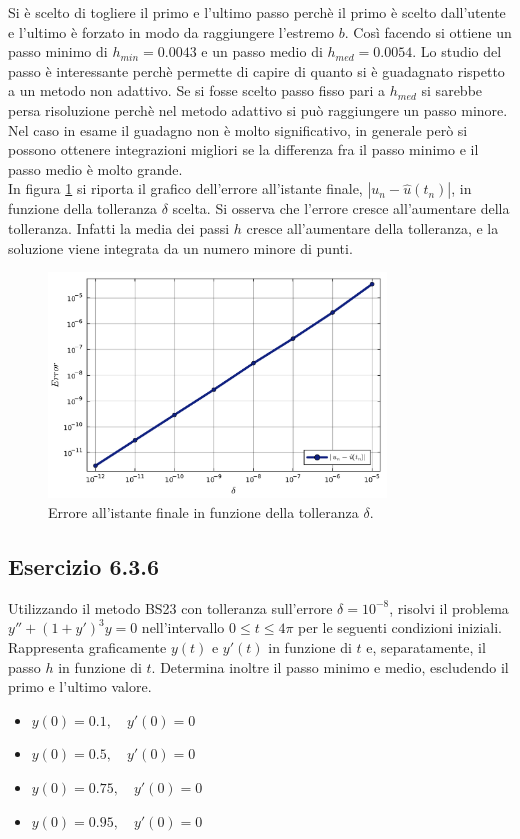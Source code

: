 \documentclass[letterpaper, 12pt]{article}
\numberwithin{equation}{section}    %
\begin{document}
Si è scelto di togliere il primo e l'ultimo passo perchè il primo è scelto dall'utente e l'ultimo
è forzato in modo da raggiungere l'estremo $b$. Così facendo si ottiene
un passo minimo di $h_{min} = 0.0043$ e un passo medio di $h_{med} = 0.0054$. Lo studio del passo è interessante
perchè permette di capire di quanto si è guadagnato rispetto a un metodo non adattivo. Se si fosse
scelto passo fisso pari a $h_{med}$ si sarebbe persa risoluzione perchè nel metodo adattivo
si può raggiungere un passo minore. Nel caso in esame il guadagno non è molto significativo, in generale però
si possono ottenere integrazioni migliori se la differenza fra il passo minimo e il passo medio è molto grande. \\
In figura \ref{fig:es6_3_5_2} si riporta il grafico dell'errore all'istante finale,
$|u_n-\hat{u}(t_n)|$, in funzione della tolleranza $\delta$ scelta. Si osserva che l'errore cresce all'aumentare
della tolleranza. Infatti la media dei passi $h$ cresce all'aumentare della tolleranza, e la soluzione 
viene integrata da un numero minore di punti.
\begin{figure}[!ht]
    \centering
    \includegraphics[width=0.8\textwidth]{6353.pdf}
    \caption{Errore all'istante finale in funzione della tolleranza $\delta$.}
    \label{fig:es6_3_5_2}
\end{figure}

\subsection{Esercizio 6.3.6}
Utilizzando il metodo BS23 con tolleranza sull'errore $\delta=10^{-8}$, risolvi il problema 
$y'' +(1+y')^3 y = 0$ nell'intervallo $0 \le t \le 4\pi$ per le seguenti condizioni iniziali. 
Rappresenta graficamente $y(t)$ e $y'(t)$ in funzione di $t$ e, separatamente, il passo $h$ in funzione di $t$. 
Determina inoltre il passo minimo e medio, escludendo il primo e l'ultimo valore.
\begin{itemize}
    \item $y(0) = 0.1,\quad y'(0) = 0$
    \item $y(0) = 0.5,\quad y'(0) = 0$
    \item $y(0) = 0.75,\quad y'(0) = 0$
    \item $y(0) = 0.95,\quad y'(0) = 0$
\end{itemize}
\end{document}

